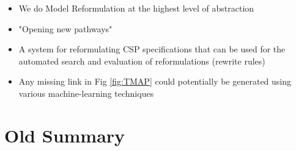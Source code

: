 \begin{itemize}
    \item We do Model Reformulation at the highest level of abstraction
    \item "Opening new pathways"
    \item A system for reformulating CSP specifications that can be used for the automated search and evaluation  of reformulations (rewrite rules)
    \item Any missing link in Fig  \ref{fig:TMAP} could potentially be generated using various machine-learning techniques
\end{itemize}

\section{Old Summary}

